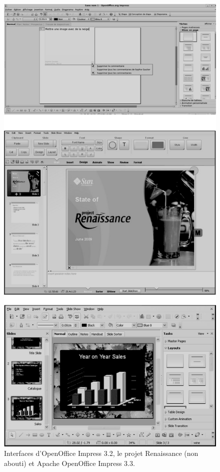 \documentclass{FramateX}
\begin{document}
\begin{refsection}
\begin{figure}
\centering
\includegraphics[scale=0.6]{images/images_thulin/Impress_comparatif.png}
\caption{Interfaces d'OpenOffice Impress 3.2, le projet Renaissance (non abouti) et Apache OpenOffice Impress 3.3.}
\end{figure}


\end{refsection}
\end{document}
